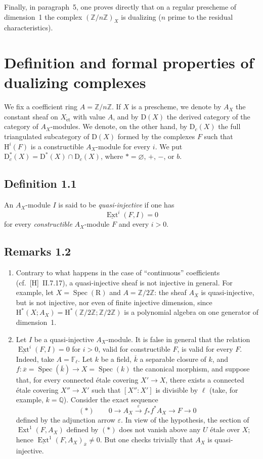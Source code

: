 \documentclass[11pt]{article}
\renewcommand{\H}{\mathrm{H}}
\DeclareMathOperator{\Ext}{Ext}
\DeclareMathOperator{\Spec}{Spec}
\newcommand{\R}{\mathrm{R}}
\newcommand{\D}{\mathrm{D}}
\newcommand{\Z}{\mathbb{Z}}
\newcommand{\F}{\mathbb{F}}
\newcommand{\Q}{\mathbb{Q}}
\newcommand{\ol}[1]{\overline{#1}}
\begin{document}
Finally, in paragraph~5, one proves directly that on a regular prescheme of dimension~1 the complex $(\Z/n\Z)_X$ is dualizing ($n$ prime to the residual characteristics).

\section{Definition and formal properties of dualizing complexes}

We fix a coefficient ring $A = \Z/n\Z$. If $X$ is a prescheme, we denote by $A_X$ the constant sheaf on $X_{\mathrm{\acute{e}t}}$ with value $A$, and by $\D(X)$ the derived category of the category of $A_X$-modules. We denote, on the other hand, by $\D_c(X)$ the full triangulated subcategory of $\D(X)$ formed by the complexes $F$ such that $\H^i(F)$ is a constructible $A_X$-module for every $i$. We put $\D_c^{*}(X) = \D^{*}(X) \cap \D_c(X)$, where $* = \varnothing$, $+$, $-$, or $b$.

\subsection*{Definition 1.1}
An $A_X$-module $I$ is said to be \emph{quasi-injective} if one has
\[
\underline{\Ext}^i(F,I) = 0
\]
for every \emph{constructible} $A_X$-module $F$ and every $i > 0$.

\subsection*{Remarks 1.2}
\begin{enumerate}[label=\alph*)]
\item Contrary to what happens in the case of ``continuous'' coefficients (cf.~[H]~II.7.17), a quasi-injective sheaf is not injective in general. For example, let $X = \Spec(\R)$ and $A = \Z/2\Z$: the sheaf $A_X$ is quasi-injective, but is not injective, nor even of finite injective dimension, since $\H^{*}(X; A_X) = \H^{*}(\Z/2\Z; \Z/2\Z)$ is a polynomial algebra on one generator of dimension~1.

\item Let $I$ be a quasi-injective $A_X$-module. It is false in general that the relation $\underline{\Ext}^i(F,I) = 0$ for $i > 0$, valid for constructible $F$, is valid for every $F$. Indeed, take $A = \F_{\ell}$. Let $k$ be a field, $\ol{k}$ a separable closure of $k$, and $f : \ol{x} = \Spec(\ol{k}) \to X = \Spec(k)$ the canonical morphism, and suppose that, for every connected étale covering $X' \to X$, there exists a connected étale covering $X'' \to X'$ such that $[X'':X']$ is divisible by $\ell$ (take, for example, $k = \Q$). Consider the exact sequence
\[
(*) \qquad 0 \longrightarrow A_X \xrightarrow{\;\varepsilon\;} f_{*}f^{*}A_X \longrightarrow F \longrightarrow 0
\]
defined by the adjunction arrow $\varepsilon$. In view of the hypothesis, the section of $\Ext^1(F,A_X)$ defined by $(*)$ does not vanish above any $U$ étale over $X$; hence $\underline{\Ext}^1(F,A_X)_{\ol{x}} \neq 0$. But one checks trivially that $A_X$ is quasi-injective.
\end{enumerate}
\end{document}
